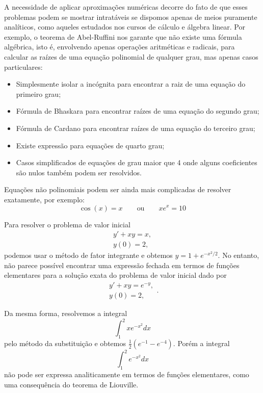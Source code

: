 A necessidade de aplicar aproximações numéricas decorre do fato de que esses problemas podem se mostrar intratáveis se dispomos apenas de meios puramente analíticos, como aqueles estudados nos cursos de cálculo e álgebra linear. Por exemplo, o teorema de Abel-Ruffini nos garante que não existe uma fórmula algébrica, isto é, envolvendo apenas operações aritméticas e radicais, para calcular as raízes de uma equação polinomial de qualquer grau, mas apenas casos particulares:
\begin{itemize}
\item Simplesmente isolar a incógnita para encontrar a raiz de uma equação do primeiro grau;
\item Fórmula de Bhaskara para encontrar raízes de uma equação do segundo grau;
\item Fórmula de Cardano para encontrar raízes de uma equação do terceiro grau;
\item Existe expressão para equações de quarto grau;
\item Casos simplificados de equações de grau maior que 4 onde alguns coeficientes são nulos também podem ser resolvidos.
\end{itemize}
Equações não polinomiais podem ser ainda mais complicadas de resolver exatamente, por exemplo:
\begin{equation}
\cos(x)=x\qquad \text{ou}\qquad xe^x= 10
\end{equation}

Para resolver o problema de valor inicial
\begin{equation}
\begin{array}{l}
y'+xy=x,\\
y(0)=2,
\end{array}
\end{equation}
podemos usar o método de fator integrante e obtemos $y=1+e^{-x^2/2}$. No entanto, não parece possível  encontrar uma expressão fechada em termos de funções elementares para a solução exata do problema de valor inicial dado por
\begin{equation}
\begin{array}{l}
y'+xy=e^{-y},\\
y(0)=2,
\end{array}.
\end{equation}


Da mesma forma, resolvemos a integral
\begin{equation}
\int_1^2xe^{-x^2}dx
\end{equation}
pelo método da substituição e obtemos $\frac{1}{2}(e^{-1}-e^{-4})$. Porém a integral
\begin{equation}
\int_1^2 e^{-x^2} dx
\end{equation}
não pode ser expressa analiticamente em termos de funções elementares, como uma consequência do teorema de Liouville.

